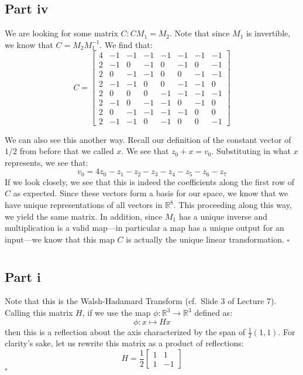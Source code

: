 \documentclass[letterpaper]{article}
\newcommand*{\QED}{\hfill\ensuremath{\square}}%
\begin{document}
\subsection{Part iv}
\label{subs:5Partiv}

We are looking for some matrix $ C : CM_1 = M_2 $.
Note that since $ M_1 $ is invertible, we know that $ C = M_2 M_1^{-1} $.
We find that:
\[
C =
\begin{bmatrix}
    4 & -1 & -1 & -1 & -1 & -1 & -1 & -1 \\
    2 & -1 & 0 & -1 & 0 & -1 & 0 & -1 \\
    2 & 0 & -1 & -1 & 0 & 0 & -1 & -1 \\
    2 & -1 & -1 & 0 & 0 & -1 & -1 & 0 \\
    2 & 0 & 0 & 0 & -1 & -1 & -1 & -1 \\
    2 & -1 & 0 & -1 & -1 & 0 & -1 & 0 \\
    2 & 0 & -1 & -1 & -1 & -1 & 0 & 0 \\
    2 & -1 & -1 & 0 & -1 & 0 & 0 & -1
\end{bmatrix}
\]

We can also see this another way.
Recall our definition of the constant vector of $ 1 / 2 $ from before that we called $ x $.
We see that $ z_0 + x = v_0 $.
Substituting in what $ x $ represents, we see that:
\[
v_0 = 4z_0 - z_1 - z_2 - z_3 - z_4 - z_5 - z_6 - z_7
\]
If we look closely, we see that this is indeed the coefficients along the first row of $ C $ as expected.
Since these vectors form a basis for our space, we know that we have unique representations of all vectors in $ \mathbb{R}^8 $.
This proceeding along this way, we yield the same matrix.
In addition, since $ M_1 $ has a unique inverse and multiplication is a valid map---in particular a map has a unique output for an input---we know that this map $ C $ is actually the unique linear transformation.
\QED{}

\section{}
\label{sec:Question6}

\subsection{Part i}
\label{subs:6Parti}

Note that this is the Walsh-Hadamard Transform (cf.\ Slide 3 of Lecture 7).
Calling this matrix $ H $, if we use the map $ \phi : \mathbb{R}^3 \to \mathbb{R}^3 $ defined as:
\[
\phi : x \mapsto Hx
\]
then this is a reflection about the axis characterized by the span of $ \frac{1}{2} (1, 1) $.
For clarity's sake, let us rewrite this matrix as a product of reflections:
\[
H =
\frac{1}{2}
\begin{bmatrix}
    1 & 1 \\ 1 & -1
\end{bmatrix}
\]
\QED{}
\end{document}
